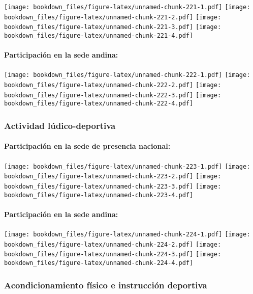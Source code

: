 \documentclass[]{article}
\let\oldparagraph\paragraph
\renewcommand{\paragraph}[1]{\oldparagraph{#1}\mbox{}}
\theoremstyle{definition}
\theoremstyle{definition}
\theoremstyle{definition}
\theoremstyle{remark}
\begin{document}
\texttt{[image: bookdown\_files/figure-latex/unnamed-chunk-221-1.pdf]}
\texttt{[image: bookdown\_files/figure-latex/unnamed-chunk-221-2.pdf]}
\texttt{[image: bookdown\_files/figure-latex/unnamed-chunk-221-3.pdf]}
\texttt{[image: bookdown\_files/figure-latex/unnamed-chunk-221-4.pdf]}

\paragraph{Participación en la sede
andina:}\label{participacion-en-la-sede-andina-27}

\texttt{[image: bookdown\_files/figure-latex/unnamed-chunk-222-1.pdf]}
\texttt{[image: bookdown\_files/figure-latex/unnamed-chunk-222-2.pdf]}
\texttt{[image: bookdown\_files/figure-latex/unnamed-chunk-222-3.pdf]}
\texttt{[image: bookdown\_files/figure-latex/unnamed-chunk-222-4.pdf]}

\subsubsection{Actividad
lúdico-deportiva}\label{actividad-ludico-deportiva-1}

\paragraph{Participación en la sede de presencia
nacional:}\label{participacion-en-la-sede-de-presencia-nacional-28}

\texttt{[image: bookdown\_files/figure-latex/unnamed-chunk-223-1.pdf]}
\texttt{[image: bookdown\_files/figure-latex/unnamed-chunk-223-2.pdf]}
\texttt{[image: bookdown\_files/figure-latex/unnamed-chunk-223-3.pdf]}
\texttt{[image: bookdown\_files/figure-latex/unnamed-chunk-223-4.pdf]}

\paragraph{Participación en la sede
andina:}\label{participacion-en-la-sede-andina-28}

\texttt{[image: bookdown\_files/figure-latex/unnamed-chunk-224-1.pdf]}
\texttt{[image: bookdown\_files/figure-latex/unnamed-chunk-224-2.pdf]}
\texttt{[image: bookdown\_files/figure-latex/unnamed-chunk-224-3.pdf]}
\texttt{[image: bookdown\_files/figure-latex/unnamed-chunk-224-4.pdf]}

\subsubsection{Acondicionamiento físico e instrucción
deportiva}\label{acondicionamiento-fisico-e-instruccion-deportiva-1}
\end{document}
